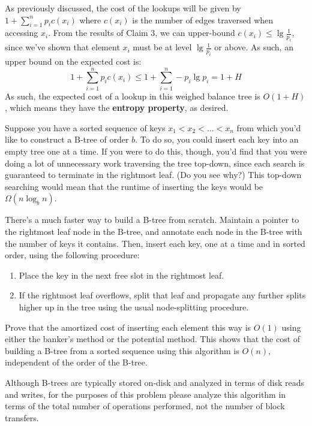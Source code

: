\documentclass[12pt]{exam}
\newcommand{\Q}[1]{\question{\large{\textbf{#1}}}}
\newcommand*{\bigo}[1]{O \left( #1 \right)}
\begin{document}
\begin{questions}
\begin{solution}
As previously discussed, the cost of the lookups will be given by $1 + \sum_{i=1}^n p_i c(x_i)$ where $c(x_i)$ is the number of edges traversed when accessing $x_i$. From the results of Claim 3, we can upper-bound $c(x_i) \leq \lg \frac{1}{p_i}$, since we've shown that element $x_i$ must be at level $\lg \frac{1}{p_i}$ or above. As such, an upper bound on the expected cost is:
$$
  1 + \sum_{i=1}^n p_i c(x_i) \leq 1 + \sum_{i=1}^n -p_i \lg p_i = 1 + H
$$
As such, the expected cost of a lookup in this weighed balance tree is $\bigo{1 + H}$, which means they have the \textbf{entropy property}, as desired.

\end{solution}

\newpage
\Q{Problem Four: Amortization}

Suppose you have a sorted sequence of keys $x_1 < x_2 < \dots < x_n$ from which you'd like to construct a B-tree of order $b$. To do so, you could insert each key into an empty tree one at a time. If you were to do this, though, you'd find that you were doing a lot of unnecessary work traversing the tree top-down, since each search is guaranteed to terminate in the rightmost leaf. (Do you see why?) This top-down searching would mean that the runtime of inserting the keys would be $\Omega(n \log_b n)$.

There's a much faster way to build a B-tree from scratch. Maintain a pointer to the rightmost leaf node in the B-tree, and annotate each node in the B-tree with the number of keys it contains. Then, insert each key, one at a time and in sorted order, using the following procedure:
\begin{enumerate}
    \item Place the key in the next free slot in the rightmost leaf.
    \item If the rightmost leaf overflows, split that leaf and propagate any further splits higher up in the tree using the usual node-splitting procedure.
\end{enumerate}

Prove that the amortized cost of inserting each element this way is $O(1)$ using either the banker's method or the potential method. This shows that the cost of building a B-tree from a sorted sequence using this algorithm is $O(n),$ independent of the order of the B-tree.

Although B-trees are typically stored on-disk and analyzed in terms of disk reads and writes, for the purposes of this problem please analyze this algorithm in terms of the total number of operations performed, not the number of block transfers.


\end{questions}
\end{document}
